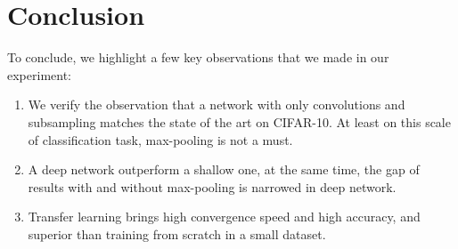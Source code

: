 \documentclass[10pt,twocolumn,letterpaper]{article}
\begin{document}
\section{Conclusion}
To conclude, we highlight a few key observations that we made in our experiment:
    \begin{enumerate}
        \item We verify the observation that a network with only convolutions and subsampling matches the state of the art on CIFAR-10. At least on this scale of classification task, max-pooling is not a must.
        \item A deep network outperform a shallow one, at the same time, the gap of results with and without max-pooling is narrowed in deep network.
        \item Transfer learning brings high convergence speed and high accuracy, and superior than training from scratch in a small dataset.
    \end{enumerate}









{\small


}
\end{document}
